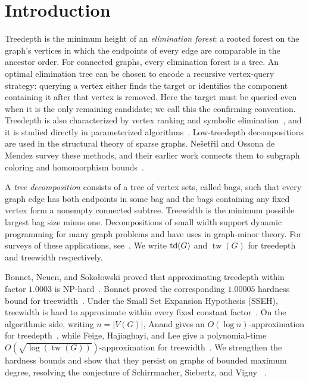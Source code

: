 ﻿\section{Introduction}
\label{sec:introduction}

Treedepth is the minimum height of an \emph{elimination forest}: a rooted forest on
the graph's vertices in which the endpoints of every edge are comparable in the
ancestor order. For connected graphs, every elimination forest is a tree.
An optimal elimination tree can be chosen to encode a recursive
vertex-query strategy: querying a vertex either finds the target or
identifies the component containing it after that vertex is removed.
Here the target must be queried even when it is the only remaining
candidate; we call this the confirming convention.
Treedepth is also characterized by vertex ranking and
symbolic elimination~\cite{BodlaenderRankings}, and it is studied directly in
parameterized algorithms~\cite{Reidl2014}. Low-treedepth decompositions are
used in the structural theory of sparse graphs. Nešetřil and Ossona de Mendez
survey these methods, and their earlier work connects them to subgraph coloring
and homomorphism bounds~\cite{LowTreeDepthSurvey,TreeDepthColoring}.

A \emph{tree decomposition} consists of a tree of vertex sets, called bags,
such that every graph edge has both endpoints in some bag and the bags
containing any fixed vertex form a nonempty connected subtree. Treewidth is the minimum
possible largest bag size minus one. Decompositions of small width support
dynamic programming for many graph problems and have uses in graph-minor
theory. For surveys of these applications, see~\cite{BodlaenderTouristGuide,
BodlaenderApplications}. We write $\operatorname{td}(G)$ and $\operatorname{tw}(G)$ for treedepth and treewidth respectively.

Bonnet, Neuen, and Soko\l owski proved that approximating
treedepth within factor $1.0003$ is NP-hard~\cite{BNS}. Bonnet proved the
corresponding $1.00005$ hardness bound for treewidth~\cite{BonnetTreewidth}.
Under the Small Set Expansion Hypothesis (SSEH), treewidth is hard to
approximate within every fixed constant factor~\cite[Theorem~1.1]{APW}. On the
algorithmic side, writing $n=|V(G)|$, Anand gives an $O(\log n)$-approximation for
treedepth~\cite{Anand2026}, while Feige, Hajiaghayi, and Lee give a polynomial-time
$O(\sqrt{\log(\operatorname{tw}(G))})$-approximation for
treewidth~\cite{FeigeHajiaghayiLee2005}. We strengthen the hardness bounds and
show that they persist on graphs of bounded maximum degree, resolving the
conjecture of Schirrmacher, Siebertz, and Vigny
~\cite[Conjecture~1]{SchirrmacherSiebertzVigny2025}.

